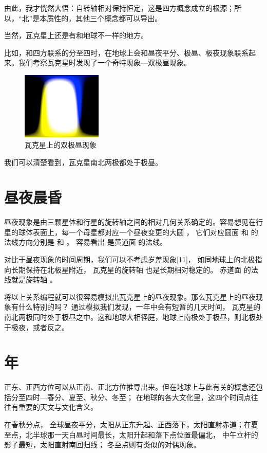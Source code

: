 \documentclass[a4paper,10.5pt]{book}
\begin{document}
由此，我才恍然大悟：自转轴相对保持恒定，这是四方概念成立的根源；所以，“北”是本质性的，其他三个概念都可以导出。

当然，瓦克星上还是有和地球不一样的地方。

比如，和四方联系的分至四时，在地球上会和昼夜平分、极昼、极夜现象联系起来。我们考察瓦克星时发现了一个奇特现象—双极昼现象。

\begin{figure}[ht]
\centering
\includegraphics[width=1.5in]{images/4_02-day-night.png}
\caption{瓦克星上的双极昼现象}
\end{figure}

我们可以清楚看到，瓦克星南北两极都处于极昼。

\section{昼夜晨昏}

昼夜现象是由三颗星体和行星的旋转轴之间的相对几何关系确定的。容易想见在行星的球体表面上，每一个母星都对应一个昼夜变更的大圆 ，
它们对应圆面   和   的法线方向分别是    和   。 容易看出   是黄道面   的法线。

对比于昼夜现象的时间周期，我们可以不考虑岁差现象[11]， 如同地球上的北极指向长期保持在北极星附近， 瓦克星的旋转轴  也是长期相对稳定的。
赤道面   的法线就是旋转轴  。

将以上关系编程就可以很容易模拟出瓦克星上的昼夜现象。那么瓦克星上的昼夜现象有什么特别的吗？ 通过模拟我们发现，一年中会有短暂的几天时间，
瓦克星的南北两极同时处于极昼之中。这和地球大相径庭，地球上南极处于极昼，则北极处于极夜，或者反之。

\section{年}

正东、正西方位可以从正南、正北方位推导出来。但在地球上与此有关的概念还包括分至四时—春分、夏至、秋分、冬至；
在地球的各大文化里，这四个时间点往往有重要的天文与文化含义。

在春秋分点， 全球昼夜平分，太阳从正东升起、正西落下，太阳直射赤道；在夏至点，北半球那一天白昼时间最长，太阳升起和落下点位置最偏北，
中午立杆的影子最短，太阳直射南回归线； 冬至点则有类似的对偶现象。
\end{document}
